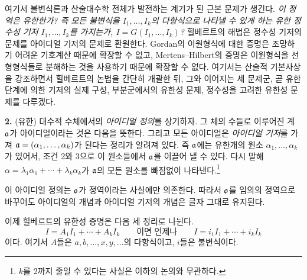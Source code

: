여기서 불변식론과 산술대수학 전체가 발전하는 계기가 된 근본 문제가 생긴다. \emph{이 정역은 유한한가? 즉 모든 불변식을 $I_1,\ldots,I_k$의 다항식으로 나타낼 수 있게 하는 유한 정수성 기저 $I_1,\ldots,I_k$를 가지는가,
$I=G(I_1,\ldots,I_k)$?} 힐베르트의 해법은 정수성 기저의 문제를 아이디얼 기저의 문제로 환원한다. Gordan의 이원형식에 대한 증명은 조망하기 어려운 기호계산 때문에 확장할 수 없고, Mertens--Hilbert의 증명은 이원형식을 선형형식들로 분해하는 것을 사용하기 때문에 확장할 수 없다. 여기서는 산술적 기본사상을 강조하면서 힐베르트의 논법을 간단히 개괄한 뒤, 그와 이어지는 세 문제군, 곧 유한 단계에 의한 기저의 실제 구성, 부분군에서의 유한성 문제, 정수성을 고려한 유한성 문제를 다루겠다.

\textbf{2.} (유한) 대수적 수체에서의 \emph{아이디얼 정의}를 상기하자. 그 체의 수들로 이루어진 계 $\mathfrak{a}$가 아이디얼이라는 것은 다음을 뜻한다.
그리고 모든 아이디얼은 \emph{아이디얼 기저}를 가져 $\mathfrak{a}=(\alpha_1,\ldots,\alpha_k)$가 된다는 정리가 알려져 있다. 즉 $\mathfrak{a}$에는 유한개의 원소 $\alpha_1,\ldots,\alpha_k$가 있어서, 조건 2와 3으로 이 원소들에서 $\mathfrak{a}$를 이끌어 낼 수 있다. 다시 말해
$\alpha=\lambda_1\alpha_1+\cdots+\lambda_k\alpha_k$가 $\mathfrak{a}$의 모든 원소를 빠짐없이 나타낸다.\footnote{$k$를 2까지 줄일 수 있다는 사실은 이하의 논의와 무관하다.}

이 아이디얼 정의는 $\mathfrak{o}$가 정역이라는 사실에만 의존한다. 따라서 $\mathfrak{o}$를 임의의 정역으로 바꾸어도 아이디얼의 개념과 아이디얼 기저의 개념은 글자 그대로 유지된다.

이제 힐베르트의 유한성 증명은 다음 세 정리로 나뉜다.
\[
 I=A_1I_1+\cdots+A_kI_k
 \qquad\text{이면 언제나}\qquad
 I=i_1I_1+\cdots+i_kI_k
\]
이다. 여기서 $A$들은 $a,b,\ldots,x,y,\ldots$의 다항식이고, $i$들은 불변식이다.

